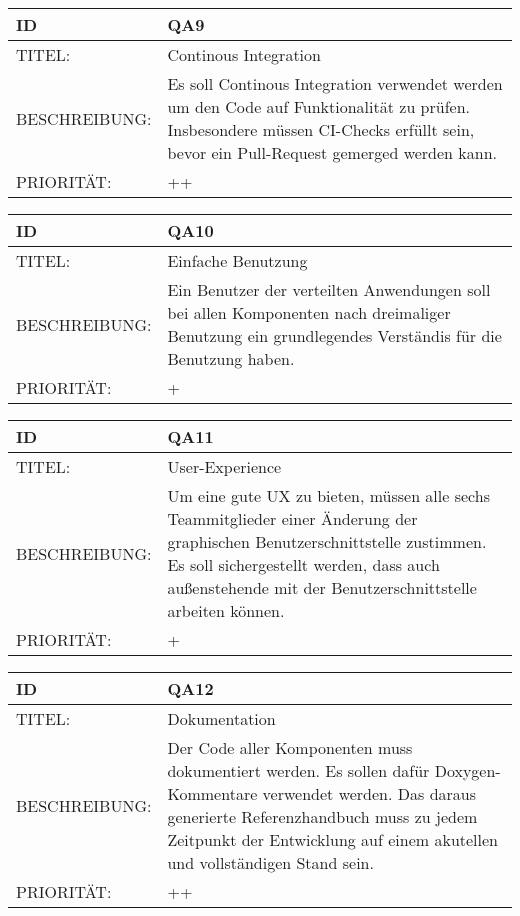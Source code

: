 \begin{tabularx}{16cm}{l|X}
	 \textbf{ID} & \textbf{QA9} \\
	 \hline
		TITEL: & Continous Integration\\ 
	 \hline 
	 BESCHREIBUNG: & Es soll Continous Integration verwendet werden um den Code auf Funktionalität zu prüfen. Insbesondere müssen CI-Checks erfüllt sein, bevor ein Pull-Request gemerged werden kann.\\
	 \hline
	 PRIORITÄT: & ++\\
\end{tabularx} 


\begin{tabularx}{16cm}{l|X}
	 \textbf{ID} & \textbf{QA10} \\
	 \hline
		TITEL: & Einfache Benutzung\\ 
	 \hline 
	 BESCHREIBUNG: & Ein Benutzer der verteilten Anwendungen soll bei allen Komponenten nach dreimaliger Benutzung ein grundlegendes Verständis für die Benutzung haben.\\ 
	 \hline
	 PRIORITÄT: & +\\
\end{tabularx} 

\begin{tabularx}{16cm}{l|X}
	 \textbf{ID} & \textbf{QA11} \\
	 \hline
		TITEL: & User-Experience\\ 
	 \hline 
	 BESCHREIBUNG: & Um eine gute UX zu bieten, müssen alle sechs Teammitglieder einer Änderung der graphischen Benutzerschnittstelle zustimmen. Es soll sichergestellt werden, dass auch außenstehende mit der Benutzerschnittstelle arbeiten können. \\
	 \hline
	 PRIORITÄT: & +\\
\end{tabularx} 


\begin{tabularx}{16cm}{l|X}
	 \textbf{ID} & \textbf{QA12} \\
	 \hline
		TITEL: & Dokumentation\\ 
	 \hline 
	 BESCHREIBUNG: & Der Code aller Komponenten muss dokumentiert werden. Es sollen dafür Doxygen-Kommentare verwendet werden. Das daraus generierte Referenzhandbuch muss zu jedem Zeitpunkt der Entwicklung auf einem akutellen und vollständigen Stand sein. \\ 
	 \hline
	 PRIORITÄT: & ++\\
\end{tabularx} 


